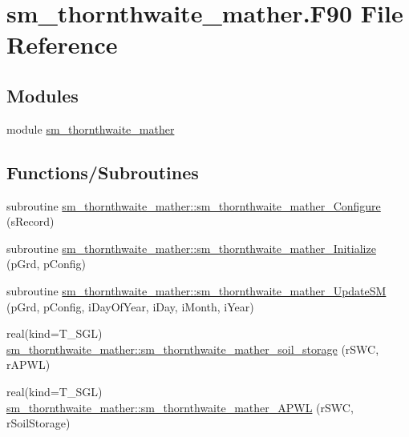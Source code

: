 \hypertarget{sm__thornthwaite__mather_8_f90}{
\section{sm\_\-thornthwaite\_\-mather.F90 File Reference}
\label{sm__thornthwaite__mather_8_f90}
}
\subsection*{Modules}
\begin{DoxyCompactItemize}
\item 
module \hyperlink{namespacesm__thornthwaite__mather}{sm\_\-thornthwaite\_\-mather}
\end{DoxyCompactItemize}
\subsection*{Functions/Subroutines}
\begin{DoxyCompactItemize}
\item 
subroutine \hyperlink{namespacesm__thornthwaite__mather_a4148064c8f4adaf87f34a3695f33063b}{sm\_\-thornthwaite\_\-mather::sm\_\-thornthwaite\_\-mather\_\-Configure} (sRecord)
\item 
subroutine \hyperlink{namespacesm__thornthwaite__mather_a75c8bba39d7a0fd7bf8b7f67cfa44998}{sm\_\-thornthwaite\_\-mather::sm\_\-thornthwaite\_\-mather\_\-Initialize} (pGrd, pConfig)
\item 
subroutine \hyperlink{namespacesm__thornthwaite__mather_a233ae5f65335221fe1cfeefbc50571cf}{sm\_\-thornthwaite\_\-mather::sm\_\-thornthwaite\_\-mather\_\-UpdateSM} (pGrd, pConfig, iDayOfYear, iDay, iMonth, iYear)
\item 
real(kind=T\_\-SGL) \hyperlink{namespacesm__thornthwaite__mather_affdc1e74886e00b012b8f2ddf3be6ef2}{sm\_\-thornthwaite\_\-mather::sm\_\-thornthwaite\_\-mather\_\-soil\_\-storage} (rSWC, rAPWL)
\item 
real(kind=T\_\-SGL) \hyperlink{namespacesm__thornthwaite__mather_a15c8accae90f6aec49dbb1ffcd53409c}{sm\_\-thornthwaite\_\-mather::sm\_\-thornthwaite\_\-mather\_\-APWL} (rSWC, rSoilStorage)
\end{DoxyCompactItemize}
